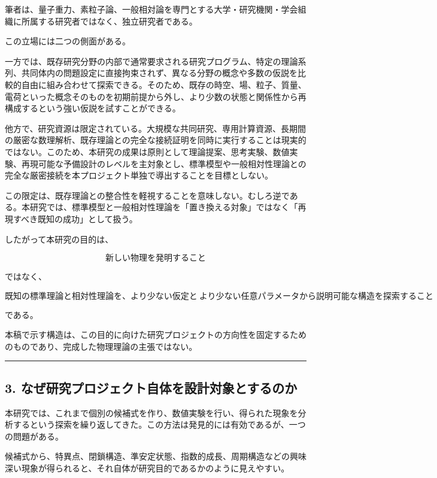 \documentclass[
  a4paper,
]{ltjsarticle}
\begin{document}
筆者は、量子重力、素粒子論、一般相対論を専門とする大学・研究機関・学会組織に所属する研究者ではなく、独立研究者である。

この立場には二つの側面がある。

一方では、既存研究分野の内部で通常要求される研究プログラム、特定の理論系列、共同体内の問題設定に直接拘束されず、異なる分野の概念や多数の仮説を比較的自由に組み合わせて探索できる。そのため、既存の時空、場、粒子、質量、電荷といった概念そのものを初期前提から外し、より少数の状態と関係性から再構成するという強い仮説を試すことができる。

他方で、研究資源は限定されている。大規模な共同研究、専用計算資源、長期間の厳密な数理解析、既存理論との完全な接続証明を同時に実行することは現実的ではない。このため、本研究の成果は原則として理論提案、思考実験、数値実験、再現可能な予備設計のレベルを主対象とし、標準模型や一般相対性理論との完全な厳密接続を本プロジェクト単独で導出することを目標としない。

この限定は、既存理論との整合性を軽視することを意味しない。むしろ逆である。本研究では、標準模型と一般相対性理論を「置き換える対象」ではなく「再現すべき既知の成功」として扱う。

したがって本研究の目的は、

\[
\boxed{\text{新しい物理を発明すること}}
\]

ではなく、

\[
\boxed{
\text{既知の標準理論と相対性理論を、より少ない仮定と}\
\text{より少ない任意パラメータから説明可能な構造を探索すること}
}
\]

である。

本稿で示す構造は、この目的に向けた研究プロジェクトの方向性を固定するためのものであり、完成した物理理論の主張ではない。

\begin{center}\rule{0.5\linewidth}{0.5pt}\end{center}

\subsection{3.
なぜ研究プロジェクト自体を設計対象とするのか}\label{ux306aux305cux7814ux7a76ux30d7ux30edux30b8ux30a7ux30afux30c8ux81eaux4f53ux3092ux8a2dux8a08ux5bfeux8c61ux3068ux3059ux308bux306eux304b}

本研究では、これまで個別の候補式を作り、数値実験を行い、得られた現象を分析するという探索を繰り返してきた。この方法は発見的には有効であるが、一つの問題がある。

候補式から、特異点、閉鎖構造、準安定状態、指数的成長、周期構造などの興味深い現象が得られると、それ自体が研究目的であるかのように見えやすい。
\end{document}
